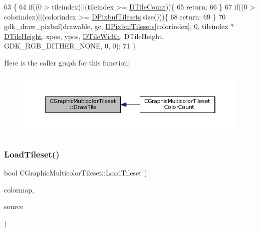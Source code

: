 \begin{DoxyCode}
63                                                                                                            
                        \{
64     \textcolor{keywordflow}{if}((0 > tileindex)||(tileindex >= \hyperlink{classCGraphicTileset_a39d942b370e47f441bf97385eb1037c8}{DTileCount}))\{
65         \textcolor{keywordflow}{return};
66     \}
67     \textcolor{keywordflow}{if}((0 > colorindex)||(colorindex >= \hyperlink{classCGraphicMulticolorTileset_a30809d113b0f314944425a3c8f21408c}{DPixbufTilesets}.size()))\{
68         \textcolor{keywordflow}{return};    
69     \}
70     gdk\_draw\_pixbuf(drawable, gc, \hyperlink{classCGraphicMulticolorTileset_a30809d113b0f314944425a3c8f21408c}{DPixbufTilesets}[colorindex], 0, tileindex * 
      \hyperlink{classCGraphicTileset_af48f32e07d5fe69afd5f764318cc3244}{DTileHeight}, xpos, ypos, \hyperlink{classCGraphicTileset_a2d0c7d19865b81911a3a43d5cae50e00}{DTileWidth}, DTileHeight, GDK\_RGB\_DITHER\_NONE, 0, 0);
71 \}
\end{DoxyCode}
Here is the caller graph for this function\+:\nopagebreak
\begin{figure}[H]
\begin{center}
\leavevmode
\includegraphics[width=350pt]{classCGraphicMulticolorTileset_a17ee648ac82c48079a1853dc8a10365a_icgraph}
\end{center}
\end{figure}
\hypertarget{classCGraphicMulticolorTileset_a6ab975d5bc2ba0ed892de03bba9242cc}{}\label{classCGraphicMulticolorTileset_a6ab975d5bc2ba0ed892de03bba9242cc} 
\subsubsection{\texorpdfstring{Load\+Tileset()}{LoadTileset()}}
{\footnotesize\ttfamily bool C\+Graphic\+Multicolor\+Tileset\+::\+Load\+Tileset (\begin{DoxyParamCaption}\item[{std\+::shared\+\_\+ptr$<$ \hyperlink{classCGraphicRecolorMap}{C\+Graphic\+Recolor\+Map} $>$}]{colormap,  }\item[{std\+::shared\+\_\+ptr$<$ \hyperlink{classCDataSource}{C\+Data\+Source} $>$}]{source }\end{DoxyParamCaption})}



